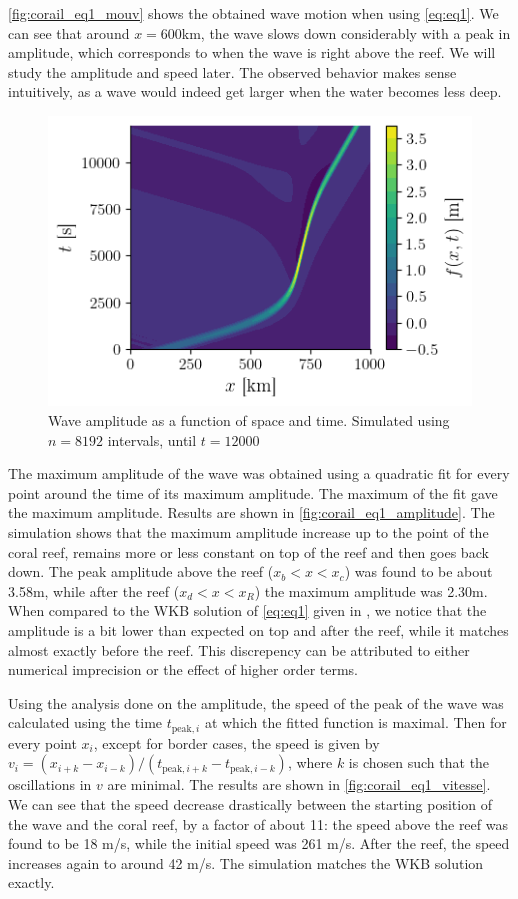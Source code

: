 \autoref{fig:corail_eq1_mouv} shows the obtained wave motion when using \autoref{eq:eq1}. We can see that around \(x=600\)km, the wave slows down considerably with a peak in amplitude, which corresponds to when the wave is right above the reef. We will study the amplitude and speed later. The observed behavior makes sense intuitively, as a wave would indeed get larger when the water becomes less deep.

\begin{figure}[h]
    \centering
    \includegraphics[width=0.6\linewidth]{figures/corail_eq1_mouvement_vague.png}
    \caption{Wave amplitude as a function of space and time. Simulated using \(n=8192\) intervals, until \(t=12000\)}
    \label{fig:corail_eq1_mouv}
\end{figure}

The maximum amplitude of the wave was obtained using a quadratic fit for every point around the time of its maximum amplitude. The maximum of the fit gave the maximum amplitude. Results are shown in \autoref{fig:corail_eq1_amplitude}. The simulation shows that the maximum amplitude increase up to the point of the coral reef, remains more or less constant on top of the reef and then goes back down. The peak amplitude above the reef (\(x_b < x < x_c\)) was found to be about 3.58m, while after the reef (\(x_d<x<x_R\)) the maximum amplitude was 2.30m. When compared to the WKB solution of \autoref{eq:eq1} given in \cite{physnumbook}, we notice that the amplitude is a bit lower than expected on top and after the reef, while it matches almost exactly before the reef. This discrepency can be attributed to either numerical imprecision or the effect of higher order terms.

Using the analysis done on the amplitude, the speed of the peak of the wave was calculated using the time \(t_{\textrm{peak},i}\) at which the fitted function is maximal. Then for every point \(x_i\), except for border cases, the speed is given by \(v_i = (x_{i+k} - x_{i-k})/(t_{\textrm{peak},i+k} - t_{\textrm{peak},i-k})\), where \(k\) is chosen such that the oscillations in \(v\) are minimal. The results are shown in \autoref{fig:corail_eq1_vitesse}. We can see that the speed decrease drastically between the starting position of the wave and the coral reef, by a factor of about 11: the speed above the reef was found to be 18 m/s, while the initial speed was 261 m/s. After the reef, the speed increases again to around 42 m/s. The simulation matches the WKB solution exactly.

